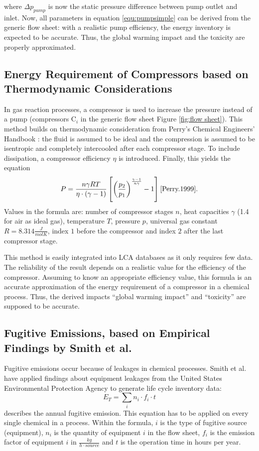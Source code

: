 where $\Delta p_{pump}$ is now the static pressure difference between pump outlet and inlet. Now, all parameters in equation \ref{equ:pumpsimple} can be derived from the generic flow sheet: with a realistic pump efficiency, the energy inventory is expected to be accurate. Thus, the global warming impact and the toxicity are properly approximated.

\subsection{Energy Requirement of Compressors based on Thermodynamic Considerations}
In gas reaction processes, a compressor is used to increase the pressure instead  of a pump  (compressors C$_i$ in the  generic flow sheet Figure \ref{fig:flow sheet}). This method builds on thermodynamic consideration from Perry's Chemical Engineers' Handbook \cite{Perry.1999}: the fluid is assumed to be ideal and the compression is assumed to be isentropic and completely intercooled after each compressor stage. To include dissipation, a compressor efficiency $\eta$ is introduced. Finally, this yields the equation \[P=\frac{n\gamma RT}{\eta\cdot (\gamma -1)}  \left[ \left(\frac{p_2}{p_1}\right)^\frac{\gamma -1}{n\gamma}-1 \right] \cite{Perry.1999}. \]
Values in the formula are: number of compressor stages $n$, heat capacities $\gamma$ (1.4 for air as ideal gas), temperature $T$, pressure $p$, universal gas constant $R=8.314 \frac{J}{mol K}$, index $1$ before the compressor and index $2$ after the last compressor stage.

This method is easily integrated into LCA databases as it only requires few data. The reliability of the result depends on a realistic value for the efficiency of the compressor. Assuming to know an appropriate efficiency value, this formula is an accurate approximation of the energy requirement of a compressor in a chemical process. Thus, the derived impacts ``global warming impact'' and ``toxicity''  are supposed to be accurate.

\subsection{Fugitive Emissions, based on Empirical Findings by Smith et al. \cite{Smith.2017}}
\label{chap:Smith}
Fugitive emissions occur because of leakages in chemical processes. Smith et al. \cite{Smith.2017} have applied findings about equipment leakages from the United States Environmental Protection Agency  \cite{U.S.EnvironmentalProtectionAgency.1995} to generate life cycle inventory data: 
\[E_T= \sum_{i}n_i \cdot f_i \cdot t\] describes the annual fugitive emission. This equation has to be applied on every single chemical in a process. Within the formula, $i$ is the type of fugitive source (equipment), $n_i$ is the quantity of equipment $i$ in the flow sheet, $f_i$ is the emission factor of equipment $i$ in $\frac{kg}{h\cdot source}$ and $t$ is the operation time in hours per year.

